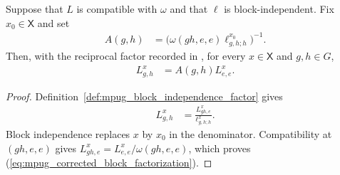\begin{lemma}
    \label{thm:mpug_block_factorization}
    \leanok
    Suppose that $L$ is compatible with $\omega$ and that $\ell$ is
    block-independent. Fix $x_0\in\mathsf X$ and set
    \begin{align}
        A(g,h)
         & =\bigl(\omega(gh,e,e)\ell^{x_0}_{g,h;h}\bigr)^{-1}.
        \label{eq:mpug_block_factor}
    \end{align}
    Then, with the reciprocal factor recorded in
    \cite{gap:fbc25_block_independence_reciprocal_errors}, for every
    $x\in\mathsf X$ and $g,h\in G$,
    \begin{align}
        L^x_{g,h}
         & =A(g,h)L^x_{e,e}.
        \label{eq:mpug_corrected_block_factorization}
    \end{align}
\end{lemma}
\begin{proof}\leanok
    Definition~\ref{def:mpug_block_independence_factor} gives
    \begin{align}
        L^x_{g,h}
         & =\frac{L^x_{gh,e}}{\ell^x_{g,h;h}}.
        \label{eq:mpug_block_factorization_first}
    \end{align}
    Block independence replaces $x$ by $x_0$ in the denominator.
    Compatibility at $(gh,e,e)$ gives
    $L^x_{gh,e}=L^x_{e,e}/\omega(gh,e,e)$, which proves
    (\ref{eq:mpug_corrected_block_factorization}).
\end{proof}

